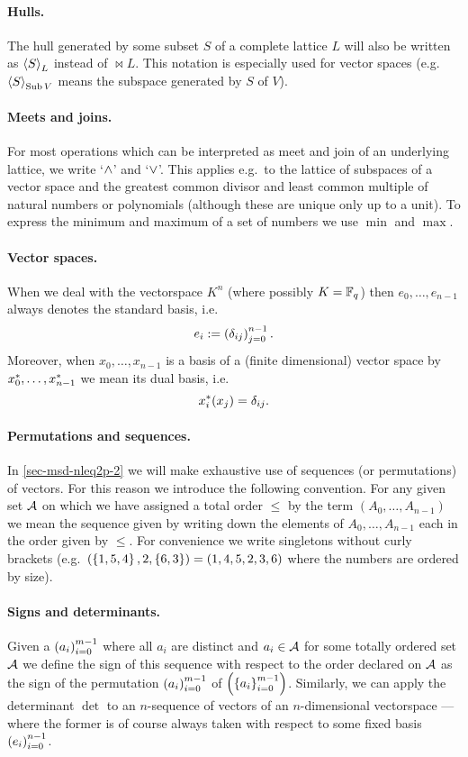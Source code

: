 \paragraph{Hulls.} The hull generated by some subset $S$ of a complete lattice $L$ will also be written as $\gen{S}_L$ instead of $\Join L$. This notation is especially used for vector spaces (e.g.~$\gen{S}_{\Sub V}$ means the subspace generated by $S$ of $V$). 

\paragraph{Meets and joins.} For most operations which can be interpreted as meet and join of an underlying lattice, we write `$\wedge$' and `$\vee$'. This applies e.g.~to the lattice of subspaces of a vector space and the greatest common divisor and least common multiple of natural numbers or polynomials (although these are unique only up to a unit).
To express the minimum and maximum of a set of numbers we use $\min$ and $\max$.

\paragraph{Vector spaces.} When we deal with the vectorspace $K^n$ (where possibly $K=\mathbb{F}_{q}$) then $e_0,\ldots,e_{n-1}$ always denotes the standard basis, i.e.
$$
e_i:=\seq{\delta_{ij}}_{j=0}^{n-1}.
$$
Moreover, when $x_0,\ldots,x_{n-1}$ is a basis of a (finite dimensional) vector space by ${x}^{\ast}_0,\ldots,{x}^{\ast}_{n-1}$ we mean its dual basis, i.e.
$$
{x}^{\ast}_i(x_j)=\delta_{ij}.
$$

\paragraph{Permutations and sequences.} In \autoref{sec-msd-nleq2p-2} we will make exhaustive use of sequences (or permutations) of vectors. For this reason we introduce the following convention. For any given set $\mathcal{A}$ on which we have assigned a total order $\leq$ by the term $(A_0,\ldots,A_{n-1})$ we mean the sequence given by writing down the elements of $A_0, \ldots, A_{n-1}$ each in the order given by $\leq$. For convenience we write singletons without curly brackets (e.g.~$\seq{\set{1,5,4},2,\set{6,3}}=\seq{1,4,5,2,3,6}$ where the numbers are ordered by size).

\paragraph{Signs and determinants.} Given a $\seq{a_i}_{i=0}^{m-1}$ where all $a_i$ are distinct and $a_i\in\mathcal{A}$ for some totally ordered set $\mathcal{A}$ we define the sign of this sequence with respect to the order declared on $\mathcal{A}$ as the sign of the permutation $\seq{a_i}_{i=0}^{m-1}$ of $\seq{\set{a_i}_{i=0}^{m-1}}$. Similarly, we can apply the determinant $\det$ to an $n$-sequence of vectors of an $n$-dimensional vectorspace --- where the former is of course always taken with respect to some fixed basis $\seq{e_i}_{i=0}^{n-1}$.

